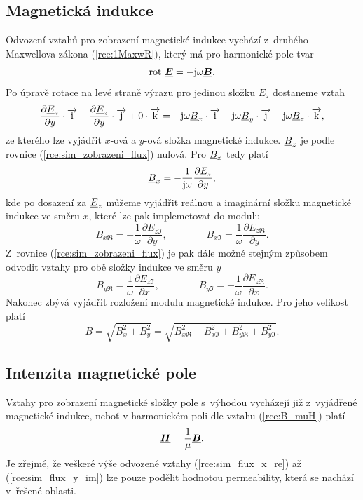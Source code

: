 \subsection*{Magnetická indukce}
Odvození vztahů pro zobrazení magnetické indukce vychází z~druhého Maxwellova zákona (\ref{rce:1MaxwR}), který má pro harmonické pole tvar
\begin{displaymath}
	\mathrm{rot}\ \mbox{\underline{\boldmath$E$}} = -\mathrm{j}\omega\mbox{\underline{\boldmath$B$}}.
\end{displaymath}
Po úpravě rotace na levé straně výrazu pro jedinou složku $E_z$ dostaneme vztah
\begin{equation}
	\frac{\partial {\underline{E}}_z}{\partial y}\cdot\overrightarrow{\mathrm{i}} - \frac{\partial {\underline{E}}_z}{\partial y}\cdot\overrightarrow{\mathrm{j}} + 0\cdot\overrightarrow{\mathrm{k}} = -\mathrm{j}\omega {\underline{B}}_x\cdot\overrightarrow{\mathrm{i}} - \mathrm{j}\omega{\underline{B}}_y\cdot\overrightarrow{\mathrm{j}} - \mathrm{j}\omega{\underline{B}}_z\cdot\overrightarrow{\mathrm{k}},
	\label{rce:sim_zobrazeni_flux}
\end{equation}
ze kterého lze vyjádřit $x$-ová a $y$-ová složka magnetické indukce. ${\underline{B}}_z$ je podle rovnice (\ref{rce:sim_zobrazeni_flux}) nulová. Pro ${\underline{B}}_x$ tedy platí
\begin{displaymath}
	{\underline{B}}_x = -\frac{1}{\mathrm{j}\omega}\frac{\partial E_z}{\partial y},
\end{displaymath}
kde po dosazení za ${\underline{E}}_z$ můžeme vyjádřit reálnou a imaginární složku magnetické indukce ve směru $x$, které lze pak implemetovat do modulu
\begin{equation}
	B_{x\Re} = -\frac{1}{\omega}\frac{\partial E_{z\Im}}{\partial y}, \qquad \qquad B_{x\Im} = \frac{1}{\omega}\frac{\partial E_{z\Re}}{\partial y}.
	\label{rce:sim_flux_x_re}
\end{equation}
Z~rovnice (\ref{rce:sim_zobrazeni_flux}) je pak dále možné stejným způsobem odvodit vztahy pro obě složky indukce ve směru $y$
\begin{equation}
	B_{y\Re} = \frac{1}{\omega}\frac{\partial E_{z\Im}}{\partial x}, \qquad \qquad B_{y\Im} = -\frac{1}{\omega}\frac{\partial E_{z\Re}}{\partial x}.
	\label{rce:sim_flux_y_im}
\end{equation}
Nakonec zbývá vyjádřit rozložení modulu magnetické indukce. Pro jeho velikost platí
\begin{displaymath}
	B = \sqrt{B_{x}^{2} + B_{y}^{2}} = \sqrt{B_{x\Re}^{2} + B_{x\Im}^{2} + B_{y\Re}^{2} + B_{y\Im}^{2}}.
\end{displaymath}

\subsection*{Intenzita magnetické pole}
Vztahy pro zobrazení magnetické složky pole s~výhodou vycházejí již z~vyjádřené magnetické indukce, neboť v harmonickém poli dle vztahu (\ref{rce:B_muH}) platí
\begin{displaymath}
\mbox{\underline{\boldmath$H$}} = \frac{1}{\mu} \mbox{\underline{\boldmath$B$}}.
\end{displaymath}
Je zřejmé, že veškeré výše odvozené vztahy (\ref{rce:sim_flux_x_re}) až (\ref{rce:sim_flux_y_im}) lze pouze podělit hodnotou permeability, která se nachází v~řešené oblasti. 

